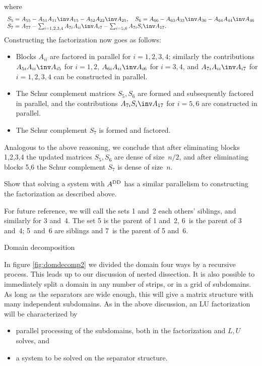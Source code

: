 where
\[ 
\begin{array}{l}
S_5=A_{55}-A_{51}A_{11}\inv A_{15}-A_{52}A_{22}\inv A_{25},\quad 
   S_6=A_{66}-A_{63}A_{33}\inv A_{36}-A_{64}A_{44}\inv A_{46}\\
   S_7=A_{77}-\sum_{i=1,2,3,4}A_{7i}A_{ii}\inv A_{i7} 
   - \sum_{i=5,6} A_{7i}S_i\inv A_{17}.
\end{array}
\]
Constructing the factorization now goes as follows:
\begin{itemize}
\item Blocks $A_{ii}$ are factored in parallel for $i=1,2,3,4$; similarly
   the contributions $A_{5i}A_{ii}\inv A_{i5}$ for $i=1,2$,
   $A_{6i}A_{ii}\inv A_{i6}$ for $i=3,4$, and $A_{7i}A_{ii}\inv
   A_{i7}$ for $i=1,2,3,4$  can be constructed in parallel.
\item The Schur complement matrices $S_5,S_6$ are formed and
  subsequently factored in parallel, and the contributions
  $A_{7i}S_i\inv A_{17}$ for $i=5,6$ are constructed in parallel.
\item The Schur complement $S_7$ is formed and factored.
\end{itemize}
Analogous to the above reasoning, we
conclude that after eliminating blocks 1,2,3,4 the updated matrices
$S_5,S_6$ are dense of size~$n/2$, and after eliminating blocks 5,6
the Schur complement $S_7$ is dense of size~$n$.

\begin{exercise}
  Show that solving a system with $A^{\mathrm{DD}}$ has a similar parallelism to
  constructing the factorization as described above.
\end{exercise}

For future reference, we will call the sets 1 and~2 each others'
siblings, and similarly for 3 and~4. The set 5 is the parent of 1
and~2, 6~is the parent of 3 and~4; 5~and~6 are siblings and 7~is the
parent of 5 and~6.

 {Domain decomposition}

In figure \ref{fig:domdecomp2} we divided the domain four ways by a
recursive process. This leads up to our discussion of nested
dissection. It is also possible to immediately split a domain in any
number of strips, or in a grid of subdomains. As long as the
separators are wide enough, this will give a matrix structure with
many independent subdomains.
As in the above discussion, an LU factorization will be characterized
by
\begin{itemize}
\item parallel processing of the subdomains, both in the factorization
  and $L,U$ solves, and
\item a system to be solved on the separator structure.
\end{itemize}

